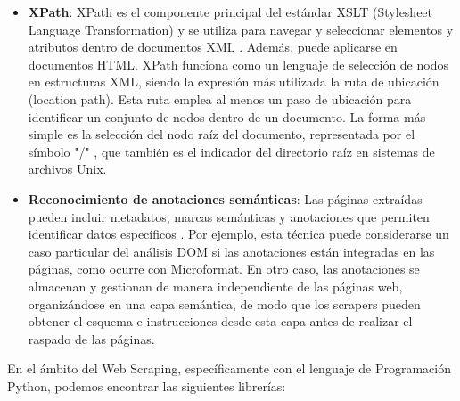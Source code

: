 \begin{itemize}
    \item \textbf{XPath}: XPath es el componente principal del estándar XSLT (Stylesheet Language Transformation) y se utiliza para navegar y seleccionar elementos y atributos dentro de documentos XML \cite{asikri}. 
    Además, puede aplicarse en documentos HTML.
    XPath funciona como un lenguaje de selección de nodos en estructuras XML, siendo la expresión más utilizada la ruta de ubicación (location path). 
    Esta ruta emplea al menos un paso de ubicación para identificar un conjunto de nodos dentro de un documento. 
    La forma más simple es la selección del nodo raíz del documento, representada por el símbolo "/" , que también es el indicador del directorio raíz en sistemas de archivos Unix.
    
    \item \textbf{Reconocimiento de anotaciones semánticas}: Las páginas extraídas pueden incluir metadatos, marcas semánticas y anotaciones que permiten identificar datos específicos \cite{inbook}. 
    Por ejemplo, esta técnica puede considerarse un caso particular del análisis DOM si las anotaciones están integradas en las páginas, como ocurre con Microformat. 
    En otro caso, las anotaciones se almacenan y gestionan de manera independiente de las páginas web, organizándose en una capa semántica, de modo que los scrapers pueden obtener el esquema e instrucciones desde esta capa antes de realizar el raspado de las páginas.


\end{itemize}

En el ámbito del Web Scraping, específicamente con el lenguaje de Programación Python, podemos encontrar las siguientes librerías:

